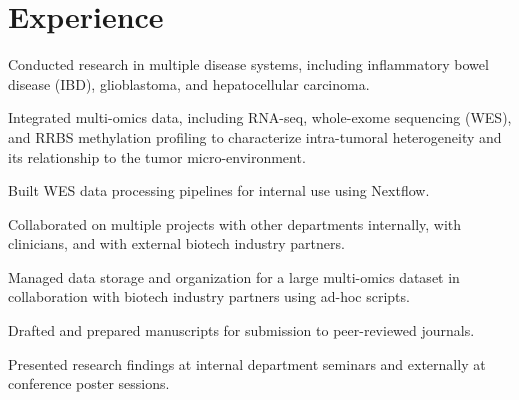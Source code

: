 \begin{minipage}[t]{0.66\textwidth} %


\section{Experience}

\vspace{\topsep} %
\begin{tightitemize}
\item Conducted research in multiple disease systems, including inflammatory bowel disease (IBD), glioblastoma, and hepatocellular carcinoma.
\item Integrated multi-omics data, including RNA-seq, whole-exome sequencing (WES), and RRBS methylation profiling to characterize intra-tumoral heterogeneity and its relationship to the tumor micro-environment.
\item Built WES data processing pipelines for internal use using Nextflow.
\item Collaborated on multiple projects with other departments internally, with clinicians, and with external biotech industry partners.
\item Managed data storage and organization for a large multi-omics dataset in collaboration with biotech industry partners using ad-hoc scripts.
\item Drafted and prepared manuscripts for submission to peer-reviewed journals.
\item Presented research findings at internal department seminars and externally at conference poster sessions. 
\end{tightitemize}

\sectionspace %



\end{minipage}
